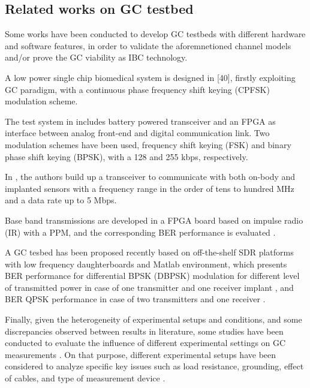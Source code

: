 
\subsection{Related works on GC testbed}
Some works have been conducted to develop GC testbeds with different hardware and software features, in order to validate the aforemnetioned channel models and/or prove the GC viability as IBC technology.

A low power single chip biomedical system is designed in [40], firstly exploiting GC paradigm, with a continuous phase frequency shift keying (CPFSK) modulation scheme.

The test system in \cite{Wegmueller2007} includes battery powered transceiver and an FPGA as interface between analog front-end and digital communication link. Two modulation schemes have been used,  frequency shift keying (FSK) and binary phase shift keying (BPSK), with a 128 and 255 kbps, respectively.

In \cite{Cho2009}, the authors build up a transceiver to communicate with both on-body and implanted sensors with a frequency range in the order of tens to hundred MHz and a data rate up to 5 Mbps. 

Base band transmissions are developed in a FPGA board based on impulse radio (IR) with a PPM, and the corresponding BER performance is evaluated  \cite{Seyedi2017}.

A GC tesbed has been proposed recently based on off-the-shelf SDR platforms with low frequency daughterboards and Matlab environment, which presents BER performance for differential BPSK (DBPSK) modulation for different level of transmitted power in case of one transmitter and one receiver implant \cite{Tomlinson2016}, and BER QPSK performance in case of two transmitters and one receiver \cite{Banou2018}.

Finally, given the heterogeneity of experimental setups and conditions, and some discrepancies observed between results in literature, some studies have been conducted to evaluate the influence of different experimental settings on GC measurements \cite{Callejon2015}.
On that purpose, different experimental setups have been considered to analyze specific key issues such as load resistance, grounding, effect of cables, and type of measurement device \cite{Callejon2015}.

